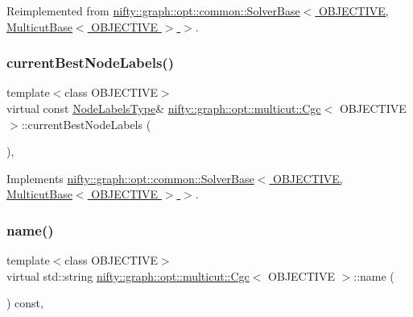Reimplemented from \hyperlink{classnifty_1_1graph_1_1opt_1_1common_1_1SolverBase_a871de6574e6189a0c97c0b2121b07155}{nifty\+::graph\+::opt\+::common\+::\+Solver\+Base$<$ O\+B\+J\+E\+C\+T\+I\+V\+E, Multicut\+Base$<$ O\+B\+J\+E\+C\+T\+I\+V\+E $>$ $>$}.

\mbox{\label{classnifty_1_1graph_1_1opt_1_1multicut_1_1Cgc_a1280ab4b4cacaf7205c7d33951931460}} 
\subsubsection{\texorpdfstring{current\+Best\+Node\+Labels()}{currentBestNodeLabels()}}
{\footnotesize\ttfamily template$<$class O\+B\+J\+E\+C\+T\+I\+VE$>$ \\
virtual const \hyperlink{classnifty_1_1graph_1_1opt_1_1multicut_1_1Cgc_a19f52bf3f00bed2816bd44604b94e7af}{Node\+Labels\+Type}\& \hyperlink{classnifty_1_1graph_1_1opt_1_1multicut_1_1Cgc}{nifty\+::graph\+::opt\+::multicut\+::\+Cgc}$<$ O\+B\+J\+E\+C\+T\+I\+VE $>$\+::current\+Best\+Node\+Labels (\begin{DoxyParamCaption}{ }\end{DoxyParamCaption})\hspace{0.3cm}{\ttfamily [inline]}, {\ttfamily [virtual]}}



Implements \hyperlink{classnifty_1_1graph_1_1opt_1_1common_1_1SolverBase_a7bbe01ee201cf3157b251e54c5ff0619}{nifty\+::graph\+::opt\+::common\+::\+Solver\+Base$<$ O\+B\+J\+E\+C\+T\+I\+V\+E, Multicut\+Base$<$ O\+B\+J\+E\+C\+T\+I\+V\+E $>$ $>$}.

\mbox{\label{classnifty_1_1graph_1_1opt_1_1multicut_1_1Cgc_a1c7194ad33e321f737b2ca33decd33f8}} 
\subsubsection{\texorpdfstring{name()}{name()}}
{\footnotesize\ttfamily template$<$class O\+B\+J\+E\+C\+T\+I\+VE$>$ \\
virtual std\+::string \hyperlink{classnifty_1_1graph_1_1opt_1_1multicut_1_1Cgc}{nifty\+::graph\+::opt\+::multicut\+::\+Cgc}$<$ O\+B\+J\+E\+C\+T\+I\+VE $>$\+::name (\begin{DoxyParamCaption}{ }\end{DoxyParamCaption}) const\hspace{0.3cm}{\ttfamily [inline]}, {\ttfamily [virtual]}}



